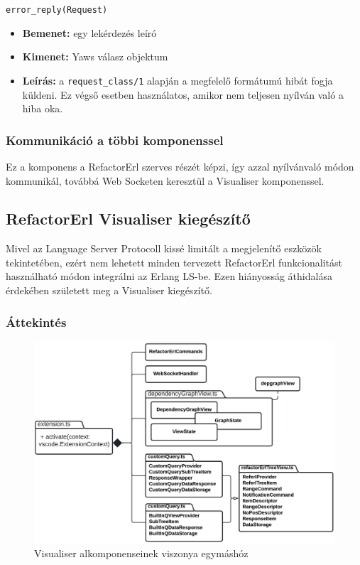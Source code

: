 \noindent \lstinline{error_reply(Request)}
\begin{itemize}
    \item \textbf{Bemenet:} egy lekérdezés leíró
    \item \textbf{Kimenet:} Yaws válasz objektum
    \item \textbf{Leírás:} a \lstinline{request_class/1} alapján a megfelelő formátumú hibát fogja küldeni. Ez végső esetben használatos, amikor nem teljesen nyílván való a hiba oka.
\end{itemize} 




\subsubsection{Kommunikáció a többi komponenssel}

Ez a komponens a RefactorErl szerves részét képzi, így azzal nyílvánvaló módon kommunikál, továbbá Web Socketen keresztül a Visualiser komponenssel.


\subsection{RefactorErl Visualiser kiegészítő}

Mivel az Language Server Protocoll kissé limitált a megjelenítő eszközök tekintetében, ezért nem lehetett minden tervezett RefactorErl funkcionalitást használható módon integrálni az Erlang LS-be. Ezen hiányosság áthidalása érdekében született meg a Visualiser kiegészítő.

\subsubsection{Áttekintés}

\begin{figure}[H]
  \centering
  \includegraphics[width=\linewidth]{images/visualiser_arch.png}
  \caption{Visualiser alkomponenseinek viszonya egymáshóz}
  \label{fig:visualiserArch}
\end{figure}

